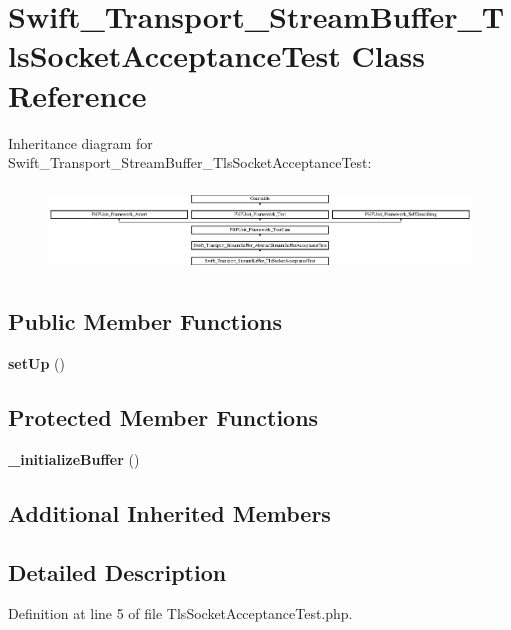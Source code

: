 \section{Swift\+\_\+\+Transport\+\_\+\+Stream\+Buffer\+\_\+\+Tls\+Socket\+Acceptance\+Test Class Reference}
\label{class_swift___transport___stream_buffer___tls_socket_acceptance_test}
Inheritance diagram for Swift\+\_\+\+Transport\+\_\+\+Stream\+Buffer\+\_\+\+Tls\+Socket\+Acceptance\+Test\+:\begin{figure}[H]
\begin{center}
\leavevmode
\includegraphics[height=2.287582cm]{class_swift___transport___stream_buffer___tls_socket_acceptance_test}
\end{center}
\end{figure}
\subsection*{Public Member Functions}
\begin{DoxyCompactItemize}
\item 
{\bf set\+Up} ()
\end{DoxyCompactItemize}
\subsection*{Protected Member Functions}
\begin{DoxyCompactItemize}
\item 
{\bf \+\_\+initialize\+Buffer} ()
\end{DoxyCompactItemize}
\subsection*{Additional Inherited Members}


\subsection{Detailed Description}


Definition at line 5 of file Tls\+Socket\+Acceptance\+Test.\+php.



